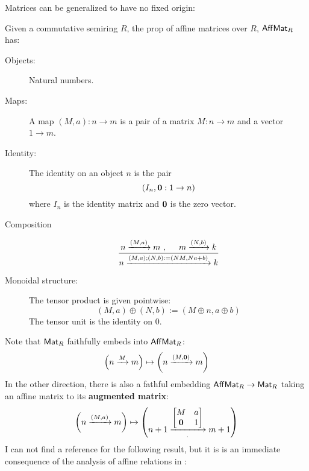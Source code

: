 Matrices can be generalized to have no fixed origin:
\begin{definition}
Given a commutative semiring $R$, the prop of affine matrices over $R$, $\mathsf{Aff}\mathsf{Mat}_R$ has:
\begin{description}
\item[Objects:] Natural numbers.
\item[Maps:] A map $(M,a):n\to m$ is a pair of a matrix $M:n\to m$ and a vector $1\to m$.
\item[Identity:] The identity on an object $n$ is the pair
$$(I_n,{\bf 0}:1\to n)$$
 where $I_n$ is the identity matrix and $\bf 0$ is the zero vector.
\item[Composition]
$$
\dfrac{
n \xrightarrow{(M,a)} m\ , \hspace*{.5cm} m \xrightarrow {(N,b)} k
}{
n \xrightarrow{(M,a);(N,b):=(NM, Na+b)} k
}
$$
\item[Monoidal structure:]  The tensor product is given pointwise:
 $$(M,a)\oplus (N,b):=(M\oplus n, a\oplus b)$$ 
The tensor unit is the identity on $0$.
\end{description}
\end{definition}
Note that  $\mathsf{Mat}_R$ faithfully embeds into $\mathsf{Aff}\mathsf{Mat}_R$:
$$
\left(n \xrightarrow{M} m\right)
\mapsto 
\left(n \xrightarrow{(M,{\bf 0})} m\right)
$$
In the other direction, there is also a fathful embedding $\mathsf{Aff}\mathsf{Mat}_R\to \mathsf{Mat}_R$ taking an affine matrix to its {\bf augmented matrix}:
$$
\left(n\xrightarrow{(M,a)} m\right)
\mapsto
\left(
\vcenter{\hbox{$\displaystyle{
n+1
\xrightarrow[ . ]{
\begin{bmatrix}
M & a\\
\mathbf{0} & 1
\end{bmatrix}}
m+1}$}}
\right)
$$
I can not find a reference for the following result, but it is is an immediate consequence of the analysis of affine relations in \cite{affine}:
